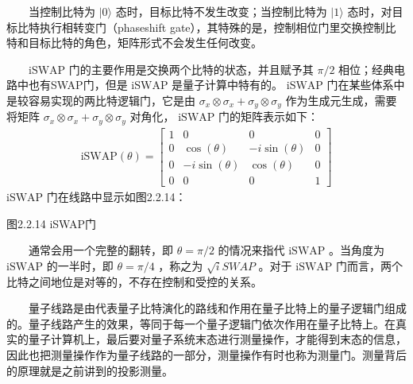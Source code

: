 \documentclass[a4paper,11pt,english]{sphinxmanual}
\begin{document}
\sphinxAtStartPar
  当控制比特为 \(|0 \rangle\) 态时，目标比特不发生改变；当控制比特为 \(|1 \rangle\) 态时，对目标比特执行相转变门（phase\sphinxhyphen{}shift gate），其特殊的是，控制相位门里交换控制比特和目标比特的角色，矩阵形式不会发生任何改变。

\sphinxAtStartPar
{}

\sphinxAtStartPar
  \(\text{iSWAP}\) 门的主要作用是交换两个比特的状态，并且赋予其 \(\pi /2\) 相位；经典电路中也有SWAP门，但是 \(\text{iSWAP}\) 是量子计算中特有的。 \(\text{iSWAP}\) 门在某些体系中是较容易实现的两比特逻辑门，它是由  \(\sigma_{x} \otimes \sigma_{x}+\sigma_{y} \otimes \sigma_{y}\) 作为生成元生成，需要将矩阵 \(\sigma_{x} \otimes \sigma_{x}+\sigma_{y} \otimes \sigma_{y}\) 对角化， \(\text{iSWAP}\) 门的矩阵表示如下：
\begin{equation*}
\begin{split}\text{iSWAP}(\theta)=\left[\begin{array}{cccc} 1 & 0 & 0 & 0 \\ 0 & \cos (\theta) & -i \sin (\theta) & 0 \\ 0 & -i \sin (\theta) & \cos (\theta) & 0 \\ 0 & 0 & 0 & 1 \end{array}\right]\end{split}
\end{equation*}
\sphinxAtStartPar
\(\text{iSWAP}\) 门在线路中显示如图2.2.14：


\begin{center}图2.2.14 iSWAP门
\end{center}
\sphinxAtStartPar
  通常会用一个完整的翻转，即 \(\theta=\pi/2\) 的情况来指代 \(\text{iSWAP}\) 。当角度为 \(\text{iSWAP}\) 的一半时，即 \(\theta=\pi/4\) ，称之为 \(\sqrt{i}SWAP\) 。对于  \(\text{iSWAP}\) 门而言，两个比特之间地位是对等的，不存在控制和受控的关系。

\sphinxAtStartPar
{}

\sphinxAtStartPar
  量子线路是由代表量子比特演化的路线和作用在量子比特上的量子逻辑门组成的。量子线路产生的效果，等同于每一个量子逻辑门依次作用在量子比特上。在真实的量子计算机上，最后要对量子系统末态进行测量操作，才能得到末态的信息，因此也把测量操作作为量子线路的一部分，测量操作有时也称为测量门。测量背后的原理就是之前讲到的投影测量。
\end{document}
